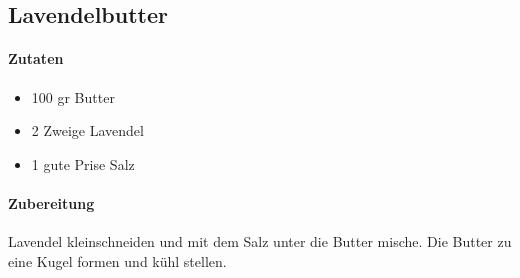 \subsection{Lavendelbutter}\label{LavButter}

\paragraph{Zutaten}

\begin{itemize}[noitemsep]
	\item 100 gr Butter
	\item 2 Zweige Lavendel
	\item 1 gute Prise Salz
\end{itemize}

\paragraph{Zubereitung}

Lavendel kleinschneiden und mit dem Salz unter die Butter mische. Die Butter zu eine Kugel formen und kühl stellen.